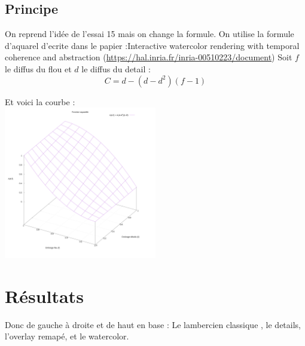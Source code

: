 \documentclass[a4paper]{article}
\begin{document}
\subsection{Principe}
On reprend l'idée de l'essai 15 mais on change la formule. On utilise la formule d'aquarel d'ecrite dans le papier :Interactive watercolor rendering with temporal coherence and abstraction (\url{https://hal.inria.fr/inria-00510223/document})
Soit $f$ le diffus du  flou et $d$ le diffus du detail :
\[ C = d-(d-d^2)(f-1)\]

Et voici la courbe : \\
\includegraphics[width=0.5\textwidth]{graphes/watercolor_curve.png}

\section{Résultats}

Donc de gauche à droite et de haut en base : 
Le lambercien classique , le details, l'overlay remapé, et le watercolor.
\end{document}
